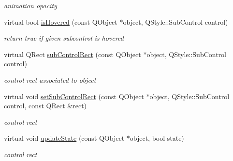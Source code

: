 \begin{DoxyCompactItemize}
\begin{DoxyCompactList}\small\item\em animation opacity \end{DoxyCompactList}\item 
\mbox{\label{class_scroll_bar_engine_a1f45b557ac1b753dd5aba54db1bcef2b}} 
virtual bool \hyperlink{class_scroll_bar_engine_a1f45b557ac1b753dd5aba54db1bcef2b}{is\+Hovered} (const Q\+Object $\ast$object, Q\+Style\+::\+Sub\+Control control)
\begin{DoxyCompactList}\small\item\em return true if given subcontrol is hovered \end{DoxyCompactList}\item 
\mbox{\label{class_scroll_bar_engine_a2e3b24c16f84112c25dc76087eaf585a}} 
virtual Q\+Rect \hyperlink{class_scroll_bar_engine_a2e3b24c16f84112c25dc76087eaf585a}{sub\+Control\+Rect} (const Q\+Object $\ast$object, Q\+Style\+::\+Sub\+Control control)
\begin{DoxyCompactList}\small\item\em control rect associated to object \end{DoxyCompactList}\item 
\mbox{\label{class_scroll_bar_engine_a8b0dd5793bfab3a4adb3845daeab6321}} 
virtual void \hyperlink{class_scroll_bar_engine_a8b0dd5793bfab3a4adb3845daeab6321}{set\+Sub\+Control\+Rect} (const Q\+Object $\ast$object, Q\+Style\+::\+Sub\+Control control, const Q\+Rect \&rect)
\begin{DoxyCompactList}\small\item\em control rect \end{DoxyCompactList}\item 
\mbox{\label{class_scroll_bar_engine_ab97fdfc138ed0fddd142c3f29ce15c3b}} 
virtual void \hyperlink{class_scroll_bar_engine_ab97fdfc138ed0fddd142c3f29ce15c3b}{update\+State} (const Q\+Object $\ast$object, bool state)
\begin{DoxyCompactList}\small\item\em control rect \end{DoxyCompactList}\item 
\mbox{\label{class_scroll_bar_engine_a60a5adfda11954c0ab8fbd0afe39be65}} 

\end{DoxyCompactItemize}
